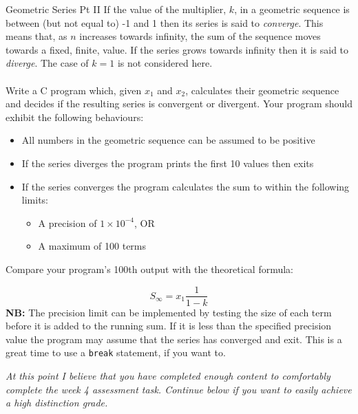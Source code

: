 \documentclass{lab}
\begin{document}
\begin{task}{Geometric Series Pt II}{}
If the value of the multiplier, $k$, in a geometric sequence is between (but not equal to) -1 and 1 then its series is said to \textit{converge}. This means that, as $n$ increases towards infinity, the sum of the sequence moves towards a fixed, finite, value. If the series grows towards infinity then it is said to \textit{diverge}. The case of $k = 1$ is not considered here.
\\ \\
Write a C program which, given $x_1$ and $x_2$, calculates their geometric sequence and decides if the resulting series is convergent or divergent. Your program should exhibit the following behaviours: 
\begin{itemize}
\item All numbers in the geometric sequence can be assumed to be positive
\item If the series diverges the program prints the first 10 values then exits
\item If the series converges the program calculates the sum to within the following limits:
	\begin{itemize}
		\item A precision of $1 \times 10^{-4}$, OR
		\item A maximum of 100 terms
	\end{itemize}
\end{itemize}

Compare your program's 100th output with the theoretical formula:

\begin{equation}
S_\infty = x_1 \frac{1}{1-k}
\end{equation}
\textbf{NB:} The precision limit can be implemented by testing the size of each term before it is added to the running sum. If it is less than the specified precision value the program may assume that the series has converged and exit. This is a great time to use a \texttt{break} statement, if you want to.
\end{task}

{\huge\textit{At this point I believe that you have completed enough content to comfortably complete the week 4 assessment task. Continue below if you want to easily achieve a high distinction grade.}}
\end{document}
